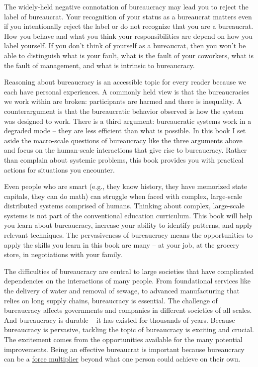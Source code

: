 The widely-held negative connotation of bureaucracy may lead you to reject the label of bureaucrat. Your recognition of your status as a bureaucrat matters even if you intentionally reject the label or do not recognize that you are a bureaucrat. How you behave and what you think your responsibilities are depend on how you label yourself.
If you don't think of yourself as a bureaucrat, then you won't be able to distinguish what is your fault, what is the fault of your coworkers, what is the fault of management, and what is intrinsic to bureaucracy. 

Reasoning about bureaucracy is an accessible topic for every reader because we each have personal experiences.
A commonly held view is that the bureaucracies we work within are broken: participants are harmed and there is inequality. 
A counterargument is that the bureaucratic behavior observed is how the system was designed to work. There is a third argument: bureaucratic systems work in a degraded mode -- they are less efficient than what is possible. 
In this book I set aside the macro-scale questions of bureaucracy like the three arguments above and focus on the human-scale interactions that give rise to bureaucracy. Rather than complain about systemic problems, this book provides you with practical actions for situations you encounter.

Even people who are smart (e.g., they know history, they have memorized state capitals, they can do math) can struggle when faced with complex, large-scale distributed systems comprised of humans. Thinking about complex, large-scale systems is not part of the conventional education curriculum. This book will help you learn about bureaucracy, increase your ability to identify patterns, and apply relevant techniques. The pervasiveness of bureaucracy means the opportunities to apply the skills you learn in this book are many -- at your job, at the grocery store, in negotiations with your family.


The difficulties of bureaucracy are central to large societies that have complicated dependencies on the interactions of many people. From foundational services like the delivery of water and removal of sewage, to advanced manufacturing that relies on long supply chains, bureaucracy is essential.  The challenge of bureaucracy affects governments and companies in different societies of all scales. And bureaucracy is durable -- it has existed for thousands of years. Because bureaucracy is pervasive, tackling the topic of bureaucracy is exciting and crucial. The excitement comes from the opportunities available for the many potential improvements.
Being an effective bureaucrat is important because bureaucracy can be a \href{https://en.wikipedia.org/wiki/Force_multiplication}{force multiplier}\iftoggle{WPinmargin}{\marginpar{$>$Wikipedia: Force multiplication}}{}
beyond what one person could achieve on their own.

